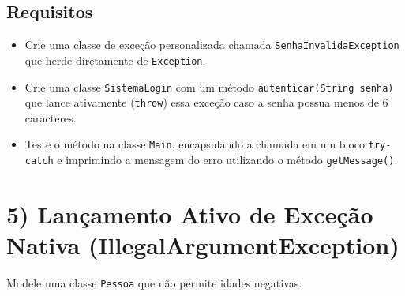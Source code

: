 \documentclass[12pt]{article}
\begin{document}
\begin{center}
\end{center}

\subsection*{Requisitos}
\begin{itemize}
    \item Crie uma classe de exceção personalizada chamada \texttt{SenhaInvalidaException} que herde diretamente de \texttt{Exception}.
    \item Crie uma classe \texttt{SistemaLogin} com um método \texttt{autenticar(String senha)} que lance ativamente (\texttt{throw}) essa exceção caso a senha possua menos de 6 caracteres.
    \item Teste o método na classe \texttt{Main}, encapsulando a chamada em um bloco \texttt{try-catch} e imprimindo a mensagem do erro utilizando o método \texttt{getMessage()}.
\end{itemize}

\section*{5) Lançamento Ativo de Exceção Nativa (IllegalArgumentException)}
Modele uma classe \texttt{Pessoa} que não permite idades negativas.

\begin{center}
\end{center}
\end{document}
